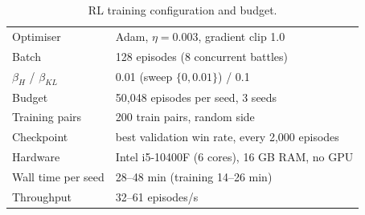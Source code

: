 \documentclass[conference]{IEEEtran}
\begin{document}
\begin{table}[!t]
\centering
\caption{RL training configuration and budget.}
\label{tab:hyper}
\footnotesize
\begin{tabular}{@{}ll@{}}
\toprule
Optimiser & Adam, $\eta = 0.003$, gradient clip 1.0 \\
Batch & 128 episodes (8 concurrent battles) \\
$\beta_H$ / $\beta_{KL}$ & 0.01 (sweep $\{0, 0.01\}$) / 0.1 \\
Budget & 50{,}048 episodes per seed, 3 seeds \\
Training pairs & 200 train pairs, random side \\
Checkpoint & best validation win rate, every 2{,}000 episodes \\
Hardware & Intel i5-10400F (6 cores), 16 GB RAM, no GPU \\
Wall time per seed & 28--48 min (training 14--26 min) \\
Throughput & 32--61 episodes/s \\
\bottomrule
\end{tabular}
\end{table}
\end{document}
